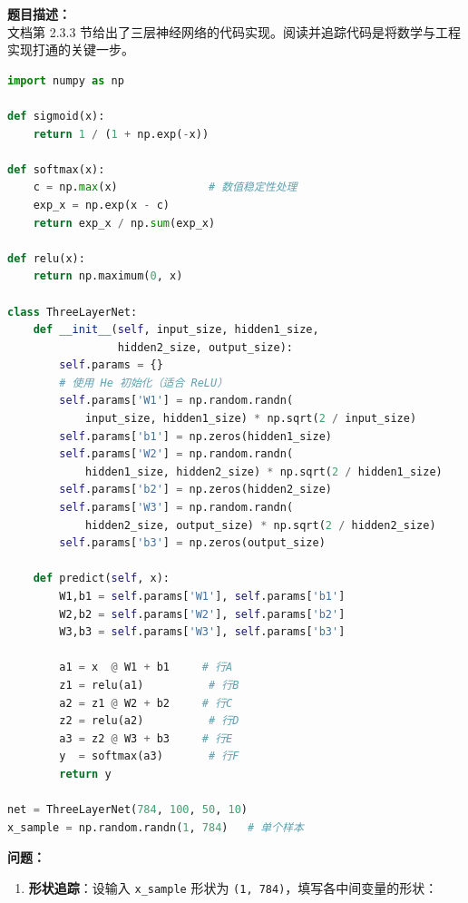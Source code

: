 \documentclass[a4paper,11pt]{ctexart}
\begin{document}
\begin{problembox}
    \textbf{题目描述：}\\
    文档第 2.3.3 节给出了三层神经网络的代码实现。阅读并追踪代码是将数学与工程实现打通的关键一步。

    \begin{lstlisting}[language=Python]
import numpy as np

def sigmoid(x):
    return 1 / (1 + np.exp(-x))

def softmax(x):
    c = np.max(x)              # 数值稳定性处理
    exp_x = np.exp(x - c)
    return exp_x / np.sum(exp_x)

def relu(x):
    return np.maximum(0, x)

class ThreeLayerNet:
    def __init__(self, input_size, hidden1_size,
                 hidden2_size, output_size):
        self.params = {}
        # 使用 He 初始化（适合 ReLU）
        self.params['W1'] = np.random.randn(
            input_size, hidden1_size) * np.sqrt(2 / input_size)
        self.params['b1'] = np.zeros(hidden1_size)
        self.params['W2'] = np.random.randn(
            hidden1_size, hidden2_size) * np.sqrt(2 / hidden1_size)
        self.params['b2'] = np.zeros(hidden2_size)
        self.params['W3'] = np.random.randn(
            hidden2_size, output_size) * np.sqrt(2 / hidden2_size)
        self.params['b3'] = np.zeros(output_size)

    def predict(self, x):
        W1,b1 = self.params['W1'], self.params['b1']
        W2,b2 = self.params['W2'], self.params['b2']
        W3,b3 = self.params['W3'], self.params['b3']

        a1 = x  @ W1 + b1     # 行A
        z1 = relu(a1)          # 行B
        a2 = z1 @ W2 + b2     # 行C
        z2 = relu(a2)          # 行D
        a3 = z2 @ W3 + b3     # 行E
        y  = softmax(a3)       # 行F
        return y

net = ThreeLayerNet(784, 100, 50, 10)
x_sample = np.random.randn(1, 784)   # 单个样本
    \end{lstlisting}

    \textbf{问题：}
    \begin{enumerate}[(1)]
        \item \textbf{形状追踪}：设输入 \texttt{x\_sample} 形状为 \texttt{(1, 784)}，填写各中间变量的形状：


\end{enumerate}
\end{problembox}
\end{document}
